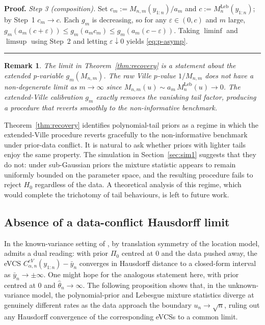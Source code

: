 \documentclass{article}%
\newtheorem{remark}[theorem]{Remark}
\newenvironment{proof}[1][Proof]{\noindent\textbf{#1.} }{\ \rule{0.5em}{0.5em}}
\newcommand{\Leb}{\mathrm{Leb}}
\newcommand{\1}{\mathbf{1}}
\begin{document}
\begin{proof}
\emph{Step 3 (composition).}
Set \(c_m:=M_{n,m}(y_{1:n})/a_m\) and \(c:=M_n^{\Leb}(y_{1:n})\); by Step~1 \(c_m\to c\). Each \(g_m\) is decreasing, so for any \(\varepsilon\in(0,c)\) and \(m\) large, \(g_m(a_m(c+\varepsilon))\leq g_m(a_m c_m)\leq g_m(a_m(c-\varepsilon))\). Taking \(\liminf\) and \(\limsup\) using Step~2 and letting \(\varepsilon\downarrow 0\) yields \eqref{eq:p-asymp}.
\end{proof}

\begin{remark}
The limit in Theorem~\ref{thm:recovery} is a statement about the
extended p-variable \(g_m(M_{n,m})\). The raw Ville $p$-value
\(1/M_{n,m}\) does not have a non-degenerate limit as $m \to \infty$ since
\(M_{n,m}(u)\sim a_m\,M_n^{\Leb}(u)\to 0\). The extended-Ville
calibration \(g_m\) exactly removes the vanishing tail factor,
producing a procedure that reverts smoothly to the non-informative benchmark.
\end{remark}

Theorem~\ref{thm:recovery} identifies polynomial-tail priors as a regime in which the extended-Ville procedure reverts gracefully to the non-informative benchmark under prior-data conflict. It is natural to ask whether priors with lighter tails enjoy the same property. The simulation in Section~\ref{sec:sim1} suggests that
they do not: under sub-Gaussian priors the mixture statistic appears to remain
uniformly bounded on the parameter space, and the resulting procedure fails to reject \(H_0\) regardless of the data. A theoretical analysis of this regime, which would complete the trichotomy of tail behaviours, is left to future work.

\subsection{Absence of a data-conflict Hausdorff limit}
In the known-variance setting of \cite{Cortinovis2025}, by translation symmetry of the location model, \cite[Theorem~4.3]{Cortinovis2025} admits a dual reading: with prior \(\Pi_0\) centred at \(0\) and the data pushed away, the eVCS \(C^{eV}_{\alpha,n}(y_{1:n})-\bar y_n\) converges in Hausdorff distance to a closed-form interval as \(\bar y_n\to\pm\infty\). One might hope for the analogous statement here, with prior centred at \(0\) and \(\widehat\theta_n\to\infty\). The following proposition shows that, in the unknown-variance model, the polynomial-prior and Lebesgue mixture statistics diverge at genuinely different rates as the data approach the boundary \(u_n\to\sqrt n\), ruling out any Hausdorff convergence of the corresponding eVCSs to a common limit.
\end{document}
